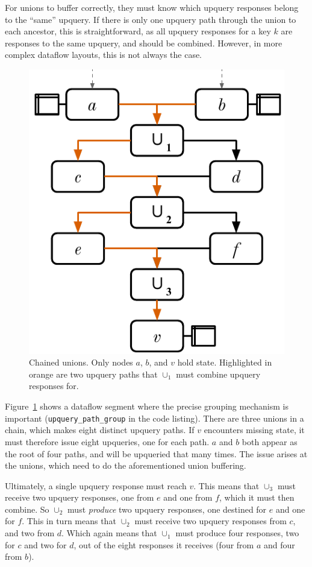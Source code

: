For unions to buffer correctly, they must know which upquery responses belong to
the ``same'' upquery. If there is only one upquery path through the union to
each ancestor, this is straightforward, as all upquery responses for a key $k$
are responses to the same upquery, and should be combined. However, in more
complex dataflow layouts, this is not always the case.

\begin{figure}[t]
  \centering
  \includegraphics{diagrams/Chained Unions.pdf}
  \caption{Chained unions. Only nodes $a$, $b$, and $v$ hold state. Highlighted
  in orange are two upquery paths that $\cup_1$ must combine upquery responses
  for.}
  \label{f:chained-union}
\end{figure}

Figure~\ref{f:chained-union} shows a dataflow segment where the precise grouping
mechanism is important (\texttt{upquery\_path\_group} in the code listing).
There are three unions in a chain, which makes eight distinct upquery paths. If
$v$ encounters missing state, it must therefore issue eight upqueries, one for
each path. $a$ and $b$ both appear as the root of four paths, and will be
upqueried that many times. The issue arises at the unions, which need to do
the aforementioned union buffering.

Ultimately, a single upquery response must reach $v$. This means that $\cup_3$
must receive two upquery responses, one from $e$ and one from $f$, which it must
then combine. So $\cup_2$ must \emph{produce} two upquery responses, one
destined for $e$ and one for $f$. This in turn means that $\cup_2$ must receive
two upquery responses from $c$, and two from $d$. Which again means that
$\cup_1$ must produce four responses, two for $c$ and two for $d$, out of the
eight responses it receives (four from $a$ and four from $b$).

